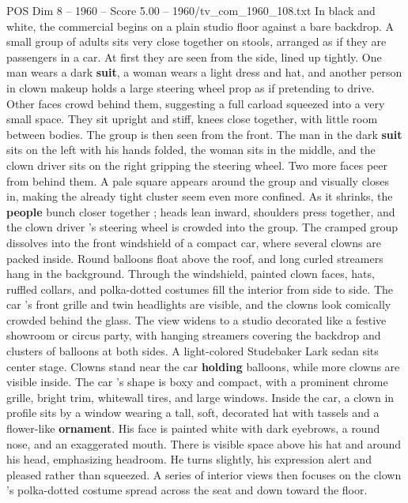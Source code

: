 \begin{textsample}{POS Dim 8 – 1960 – Score 5.00 – 1960/tv\_com\_1960\_108.txt}  \label{ex:f8_pos_086}
In black and white, the commercial begins on a plain studio floor against a bare backdrop.
A small group of adults sits very close together on stools, arranged as if they are passengers in a car.
At first they are seen from the side, lined up tightly.
One man wears a dark \textbf{suit}, a woman wears a light dress and hat, and another person in clown makeup holds a large steering wheel prop as if pretending to drive.
Other faces crowd behind them, suggesting a full carload squeezed into a very small space.
They sit upright and stiff, knees close together, with little room between bodies.
The group is then seen from the front.
The man in the dark \textbf{suit} sits on the left with his hands folded, the woman sits in the middle, and the clown driver sits on the right gripping the steering wheel.
Two more faces peer from behind them.
A pale square appears around the group and visually closes in, making the already tight cluster seem even more confined.
As it shrinks, the \textbf{people} bunch closer together ; heads lean inward, shoulders press together, and the clown driver ’s steering wheel is crowded into the group.
The cramped group dissolves into the front windshield of a compact car, where several clowns are packed inside.
Round balloons float above the roof, and long curled streamers hang in the background.
Through the windshield, painted clown faces, hats, ruffled collars, and polka-dotted costumes fill the interior from side to side.
The car ’s front grille and twin headlights are visible, and the clowns look comically crowded behind the glass.
The view widens to a studio decorated like a festive showroom or circus party, with hanging streamers covering the backdrop and clusters of balloons at both sides.
A light-colored Studebaker Lark sedan sits center stage.
Clowns stand near the car \textbf{holding} balloons, while more clowns are visible inside.
The car ’s shape is boxy and compact, with a prominent chrome grille, bright trim, whitewall tires, and large windows.
Inside the car, a clown in profile sits by a window wearing a tall, soft, decorated hat with tassels and a flower-like \textbf{ornament}.
His face is painted white with dark eyebrows, a round nose, and an exaggerated mouth.
There is visible space above his hat and around his head, emphasizing headroom.
He turns slightly, his expression alert and pleased rather than squeezed.
A series of interior views then focuses on the clown ’s polka-dotted costume spread across the seat and down toward the floor.

\end{textsample}
